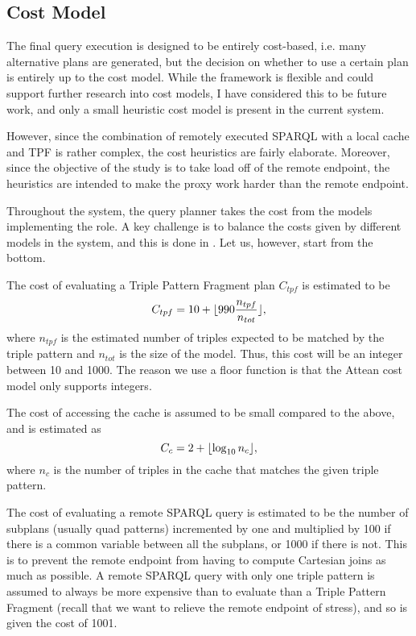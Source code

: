 \subsection{Cost Model}\label{sec:costheuristics}

The final query execution is designed to be entirely cost-based,
i.e. many alternative plans are generated, but the decision on whether
to use a certain plan is entirely up to the cost model. While the
framework is flexible and could support further research into cost
models, I have considered this to be future work, and only a small
heuristic cost model is present in the current system. 

However, since the combination of remotely executed SPARQL with a
local cache and TPF is rather complex, the cost
heuristics are fairly elaborate. Moreover, since the objective of the
study is to take load off of the remote endpoint, the heuristics are
intended to make the proxy work harder than the remote endpoint.

Throughout the system, the query planner takes the cost from the
models implementing the  role. A
key challenge is to balance the costs given by different models in the
system, and this is done in
. Let us, however, start
from the bottom. 

The cost of evaluating a Triple Pattern Fragment plan $C_{tpf}$ is estimated to
be 
\begin{equation}
C_{tpf} = 10 + \lfloor 990 \frac{n_{tpf}}{n_{tot}} \rfloor ,
\end{equation}
where $n_{tpf}$ is the estimated number of triples expected to be
matched by the triple pattern and $n_{tot}$ is the size of the
model. Thus, this cost will be an integer between 10 and 1000. The
reason we use a floor function is that the Attean cost model only
supports integers.

The cost of accessing the cache is assumed to be small compared to the
above, and is estimated as 
\begin{equation}
C_c = 2 + \lfloor \log_{10}{n_c} \rfloor , 
\end{equation}
where $n_c$ is the number of triples in the cache that matches the
given triple pattern.

The cost of evaluating a remote SPARQL query is estimated to be the
number of subplans (usually quad patterns) incremented by one and
multiplied by 100 if there is a common variable between all the
subplans, or 1000 if there is not. This is to prevent the remote
endpoint from having to compute Cartesian joins as much as possible. A
remote SPARQL query with only one triple pattern is assumed to always
be more expensive than to evaluate than a Triple Pattern Fragment
(recall that we want to relieve the remote endpoint of stress), and so
is given the cost of 1001.


